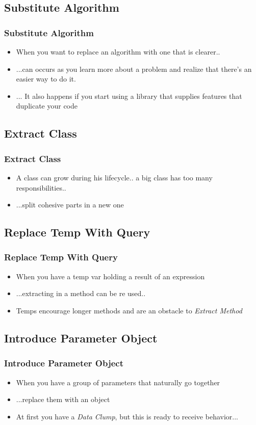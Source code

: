 \documentclass{beamer}
\begin{document}
\subsection{Substitute Algorithm}
\begin{frame}
  \frametitle{Substitute Algorithm}
  \begin{itemize}
	\item<+-> When you want to replace an algorithm with one that is clearer..
	\item<+-> ...can occurs as you learn more about a problem and realize that there's an easier way to do it.
	\item<+-> ... It also happens if you start using a library that supplies features that duplicate your code
  \end{itemize}
\end{frame}

\subsection{Extract Class}
\begin{frame}
  \frametitle{Extract Class}
  \begin{itemize}
	\item<+-> A class can grow during his lifecycle.. a big class has too many responsibilities..
	\item<+-> ...split cohesive parts in a new one
  \end{itemize}
\end{frame}

\subsection{Replace Temp With Query}
\begin{frame}
  \frametitle{Replace Temp With Query}
  \begin{itemize}
	\item<+-> When you have a temp var holding a result of an expression
	\item<+-> ...extracting in a method can be re used..
	\item<+-> Temps encourage longer methods and are an obstacle to \textit{Extract Method}
  \end{itemize}
\end{frame}

\subsection{Introduce Parameter Object}
\begin{frame}
  \frametitle{Introduce Parameter Object}
  \begin{itemize}
	\item<+-> When you have a group of parameters that naturally go together
	\item<+-> ...replace them with an object
	\item<+-> At first you have a \textit{Data Clump}, but this is ready to receive behavior...
  \end{itemize}
\end{frame}
\end{document}
